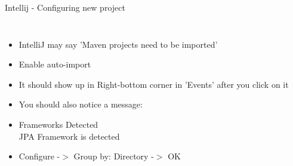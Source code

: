 \documentclass[aspectratio=1610,english]{beamer} %
\begin{document}
	\begin{frame}{Intellij - Configuring new project}
		\begin{columns}
				\begin{itemize}
					\tiny
					\color{black}
					\item IntelliJ may say 'Maven projects need to be imported'
					\item Enable auto-import
					\item It should show up in Right-bottom corner in 'Events' after you click on it
					\item You should also notice a message:
					\item Frameworks Detected \\
						JPA Framework is detected
					\item Configure -$>$ Group by: Directory -$>$ OK
				\end{itemize}
			
				\begin{minipage}{\textwidth}
				\end{minipage}
				\begin{minipage}{\textwidth}
				\end{minipage}
		\end{columns}
	\end{frame}
\end{document}
